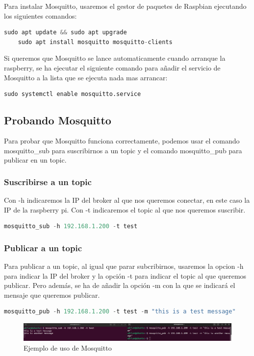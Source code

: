\begin{titlepage}
Para instalar Mosquitto, usaremos el gestor de paquetes de Raspbian ejecutando los siguientes comandos:\\
\begin{lstlisting}[language=python]
	sudo apt update && sudo apt upgrade
	sudo apt install mosquitto mosquitto-clients
\end{lstlisting}

Si queremos que Mosquitto se lance automaticamente cuando arranque la raspberry, se ha ejecutar el siguiente comando para añadir el servicio de Mosquitto a la lista que se ejecuta nada mas arrancar:\\
\begin{lstlisting}[language=python]
	sudo systemctl enable mosquitto.service
\end{lstlisting}

\subsection{Probando Mosquitto}

Para probar que Mosquitto funciona correctamente, podemos usar el comando mosquitto\_sub para suscribirnos a un topic y el comando mosquitto\_pub para publicar en un topic.\\
\subsubsection{Suscribirse a un topic}
Con -h indicaremos la IP del broker al que nos queremos conectar, en este caso la IP de la raspberry pi. Con -t indicaremos el topic al que nos queremos suscribir.\\
\begin{lstlisting}[language=python]
mosquitto_sub -h 192.168.1.200 -t test
\end{lstlisting}

\subsubsection{Publicar a un topic}
Para publicar a un topic, al igual que parar subcribirnos, usaremos la opcion -h para indicar la IP del broker y la opción -t para indicar el topic al que queremos publicar. Pero además, se ha de añadir la opción -m con la que se indicará el mensaje que queremos publicar.\\

\begin{lstlisting}[language=python]
mosquitto_pub -h 192.168.1.200 -t test -m "this is a test message"
\end{lstlisting}

\begin{figure}[h!]
	\centering
	\includegraphics[width=1\textwidth]{imagenes/mqtt_test.png}
	\caption{Ejemplo de uso de Mosquitto}
\end{figure}

\end{titlepage}
